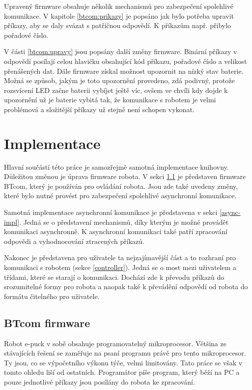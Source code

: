 \documentclass[12pt,notitlepage]{report}
\begin{document}
    Upravený firmware obsahuje několik mechanismů pro zabezpečení spolehlivé
    komunikace. V kapitole \ref{btcom:prikazy} je popsáno jak bylo potřeba
    upravit příkazy, aby se daly svázat s patřičnou odpovědí. K příkazům např.
    přibylo pořadové číslo.

    V části \ref{btcom:upravy} jsou popsány další změny firmware. Binární
    příkazy v odpovědi posílají celou hlavičku obsahující kód příkazu, pořadové
    číslo a velikost přenášených dat. Dále firmware získal možnost upozornit na
    nízký stav baterie. Možná se způsob, jakým je toto upozornění provedeno,
    zdá podivný, protože rozsvícení LED začne baterii vybíjet ještě víc, ovšem
    ve chvíli kdy dojde k upozornění už je baterie vybitá tak, že komunikace s
    robotem je velmi problémová a složitější příkazy už stejně není schopen
    vykonat.

\chapter{Implementace} %
\label{Implementace}

    Hlavní součástí této práce je samozřejmě samotná implementace knihovny.
    Důležitou změnou je úprava firmware robota. V sekci \ref{btcom} je
    představen firmware BTcom, který je používán pro ovládání robota. Jsou zde
    také uvedeny změny, které bylo nutné provést pro zabezpečení spolehlivé
    asynchronní komunikace.

    Samotná implementace asynchronní komunikace je představena v sekci
    \ref{async-impl}. Jedná se o představení mechanismů, díky kterým je možné
    provádět komunikaci asynchronně. K asynchronní komunikaci také patří
    zpracování odpovědi a vyhodnocování ztracených příkazů.

    Nakonec je představena pro uživatele ta nejzajímavější část a to rozhraní
    pro komunikaci s robotem (sekce \ref{controller}). Jedná se o most mezi
    uživatelem a třídami, které se starají o komunikaci. Dochází zde k převodu
    příkazů do srozumitelné formy pro robota a naopak také k převádění odpovědí
    od robota do formátu čitelného pro uživatele.

    \section{BTcom firmware}
    \label{btcom}

    Robot e-puck v sobě obsahuje programovatelný mikroprocesor. Většina ze
    stávajících řešení se zaměřuje na psaní programu právě pro tento
    mikroprocesor. Ty jsou, co se výpočetního výkonu týče, velmi limitovány.
    Tato práce se však v tomto ohledu liší od ostatních. Programátor píše
    program, který běží na PC a pouze jednotlivé příkazy jsou posílány do
    robota ke zpracování.
\end{document}
